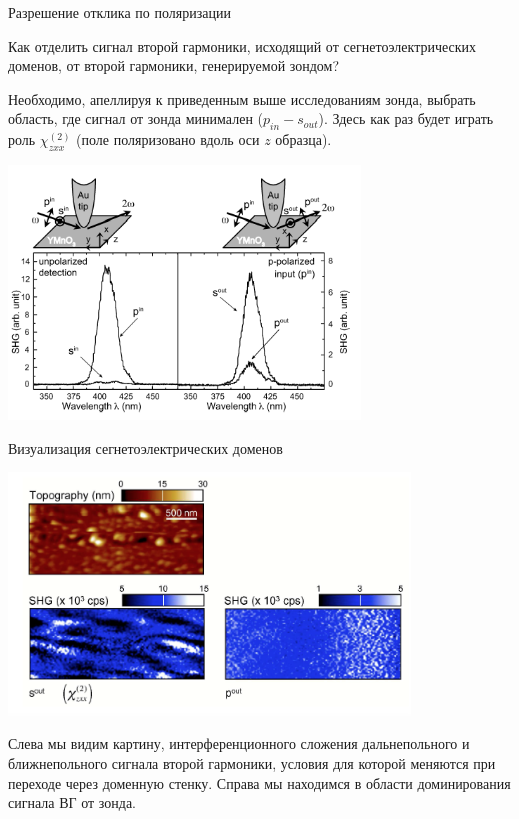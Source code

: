 \documentclass[9pt, compress, xcolor=table]{beamer}
\begin{document}
\begin{frame}{Разрешение отклика по поляризации}

Как отделить сигнал второй гармоники, исходящий от сегнетоэлектрических доменов, от второй гармоники, генерируемой зондом?

Необходимо, апеллируя к приведенным выше исследованиям зонда, выбрать область, где сигнал от зонда минимален ($p_{in} - s_{out}$). Здесь как раз будет играть роль $\chi_{zxx}^{(2)}$ (поле поляризовано вдоль оси $z$ образца).

\begin{center}
\includegraphics[width=0.7\textwidth]{shg17}

\end{center}

\end{frame}

\begin{frame}{Визуализация сегнетоэлектрических доменов}

\begin{center}
\includegraphics[width=0.8\textwidth]{shg19}

\end{center}

Слева мы видим картину, интерференционного сложения дальнепольного и ближнепольного сигнала второй гармоники, условия для которой меняются при переходе через доменную стенку. Справа мы находимся в области доминирования сигнала ВГ от зонда.


\end{frame}
\end{document}
